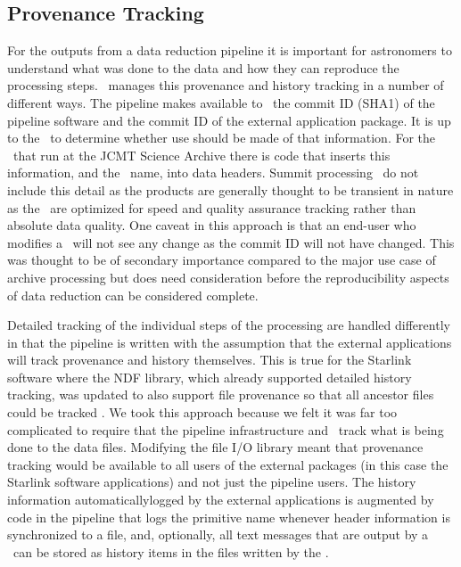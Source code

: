 \documentclass[final,authoryear,5p,times,twocolumn]{elsarticle}
\begin{document}
\subsection{Provenance Tracking}
\label{sec:prov}

For the outputs from a data reduction pipeline it is important for
astronomers to understand what was done to the data and how they can
reproduce the processing steps. \oracdr\ manages this provenance and
history tracking in a number of different ways. The pipeline makes available to
\primitives\ the commit ID (SHA1) of the pipeline software and the
commit ID of the external application package. It is up to the
\recipe\ to determine whether use should be made of that
information. For the \recipes\ that run at the JCMT Science Archive
\citep{2014Economou} there is code that inserts this information, and
the \recipe\ name, into data headers. Summit processing \recipes\ do
not include this detail as the products are generally thought to be
transient in nature as the \recipes\ are optimized for speed and
quality assurance tracking rather than absolute data quality. One
caveat in this approach is that an end-user who modifies a
\recipe\ will not see any change as the commit ID will not have
changed. This was thought to be of secondary importance compared to
the major use case of archive processing but does need consideration
before the reproducibility aspects of data reduction can be considered
complete.

Detailed tracking of the individual steps of the processing are
handled differently in that the pipeline is written with the
assumption that the external applications will track provenance and
history themselves. This is true for the Starlink software where the
NDF library, which already supported detailed history tracking, was
updated to also support file provenance so that all ancestor files
could be tracked \citep[see e.g.][for details on the provenance algorithm]{ndfjenness}.
We took this approach because we felt it was far too complicated to
require that the pipeline infrastructure and \primitives\ track what
is being done to the data files. Modifying the file I/O library meant
that provenance tracking would be available to all users of the
external packages (in this case the Starlink software applications)
and not just the pipeline users. The history information automaticallylogged by the external
applications is augmented by code in the pipeline that logs the
primitive name whenever header information is synchronized to a file,
and, optionally, all text messages that are output by a \primitive\ can be
stored as history items in the files written by the \primitive.
\end{document}

